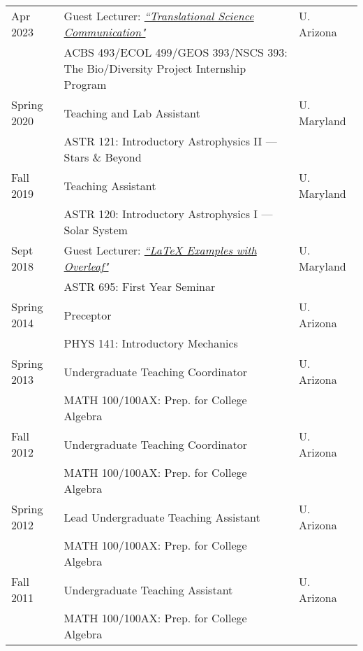 \documentclass[11pt]{article}
\begin{document}
\begin{longtable}{p{} p{}p{}}

Apr 2023 & Guest Lecturer: \href{https://github.com/rclevy/rclevy.github.io/blob/master/assets/pdf/BioDiversity_GuestLecture_TranslationalSciComm_RLevy_20230405.pdf}{\em ``Translational Science Communication"} &{\small U. Arizona}\\
& ACBS 493/ECOL 499/GEOS 393/NSCS 393: The Bio/Diversity Project Internship Program\medskip&\\

Spring 2020 & Teaching and Lab Assistant & {\small U. Maryland}\\
& ASTR 121: Introductory Astrophysics II --- Stars \& Beyond\medskip & \\

Fall 2019 & Teaching Assistant & {\small U. Maryland}\\
 & ASTR 120: Introductory Astrophysics I --- Solar System\medskip & \\

Sept 2018 & Guest Lecturer: \href{https://github.com/rclevy/LaTeX-Examples-with-Overleaf-for-ASTR-695}{\em ``LaTeX Examples with Overleaf"} & {\small U. Maryland}\\
& ASTR 695: First Year Seminar \medskip&\\

Spring 2014 & Preceptor & \small {U. Arizona}\\
& PHYS 141: Introductory Mechanics\medskip&\\

Spring 2013 & Undergraduate Teaching Coordinator & {\small U. Arizona} \\
& MATH 100/100AX: Prep. for College Algebra \medskip\\

Fall 2012 & Undergraduate Teaching Coordinator & {\small U. Arizona}\\
& MATH 100/100AX: Prep. for College Algebra \medskip\\

Spring 2012 & Lead Undergraduate Teaching Assistant &  {\small U. Arizona}\\
& MATH 100/100AX: Prep. for College Algebra \medskip\\

Fall 2011 & Undergraduate Teaching Assistant & {\small U. Arizona} \\
& MATH 100/100AX: Prep. for College Algebra\\
\end{longtable}
\end{document}
